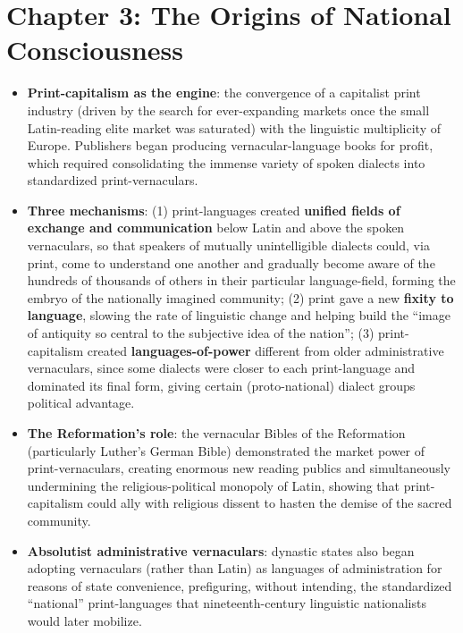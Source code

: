 \documentclass[12pt]{article}
\begin{document}
\section{Chapter 3: The Origins of National Consciousness}

\begin{itemize}[leftmargin=*, itemsep=4pt]
    \item \textbf{Print-capitalism as the engine}: the convergence of a capitalist print industry (driven by the search for ever-expanding markets once the small Latin-reading elite market was saturated) with the linguistic multiplicity of Europe. Publishers began producing vernacular-language books for profit, which required consolidating the immense variety of spoken dialects into standardized print-vernaculars.
    \item \textbf{Three mechanisms}: (1) print-languages created \textbf{unified fields of exchange and communication} below Latin and above the spoken vernaculars, so that speakers of mutually unintelligible dialects could, via print, come to understand one another and gradually become aware of the hundreds of thousands of others in their particular language-field, forming the embryo of the nationally imagined community; (2) print gave a new \textbf{fixity to language}, slowing the rate of linguistic change and helping build the ``image of antiquity so central to the subjective idea of the nation''; (3) print-capitalism created \textbf{languages-of-power} different from older administrative vernaculars, since some dialects were closer to each print-language and dominated its final form, giving certain (proto-national) dialect groups political advantage.
    \item \textbf{The Reformation's role}: the vernacular Bibles of the Reformation (particularly Luther's German Bible) demonstrated the market power of print-vernaculars, creating enormous new reading publics and simultaneously undermining the religious-political monopoly of Latin, showing that print-capitalism could ally with religious dissent to hasten the demise of the sacred community.
    \item \textbf{Absolutist administrative vernaculars}: dynastic states also began adopting vernaculars (rather than Latin) as languages of administration for reasons of state convenience, prefiguring, without intending, the standardized ``national'' print-languages that nineteenth-century linguistic nationalists would later mobilize.
\end{itemize}
\end{document}
